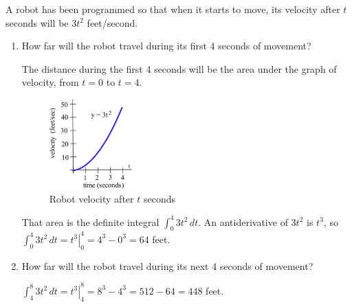 \begin{example}
A robot has been programmed so that when it starts to move, its velocity after $t$ seconds will be $3t^2$ feet/second.
  \begin{enumerate}[label=(\alph*)]
    \item How far will the robot travel during its first 4 seconds of movement?

    \begin{solution}
      The distance during the first 4 seconds will be the area under the graph of velocity, from $t=0$ to $t=4$.

      \begin{figure}[!ht]
        \centering
          \includegraphics[width=0.3\textwidth]{img/chap5/image044.png}
          \caption{Robot velocity after $t$ seconds}
          \label{fig:5-5-robot}
      \end{figure}
That area is the definite integral $\displaystyle\int_0^4 3t^2\,dt$. An antiderivative of $3t^2$ is $t^3$, so $\displaystyle\int_0^4 3t^2\,dt = \left.t^3\right|_0^4 = 4^3-0^3=64$ feet.
      \end{solution}
    \item How far will the robot travel during its next 4 seconds of movement?

    \begin{solution}
      $\displaystyle\int_4^8 3t^2\, dt = \left.t^3\right|_4^8 = 8^3-4^3=512-64=448$ feet.
      \end{solution}
  \end{enumerate}
\end{example}


